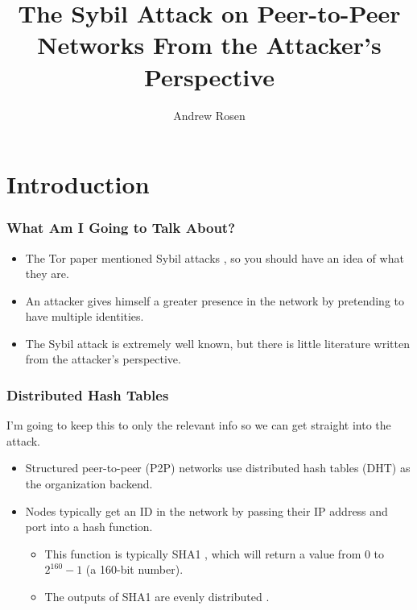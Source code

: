 \documentclass[11pt]{beamer}
\author{Andrew Rosen}
\title{The Sybil Attack on Peer-to-Peer Networks From the Attacker's Perspective}
\institute{Georgia State University}
\begin{document}
    \maketitle
    
    
    \section{Introduction}
    \begin{frame}
        \frametitle[Introduction]{What Am I Going to Talk About? }
        \begin{itemize}
            \item The Tor paper mentioned Sybil attacks \cite{sybil}, so you should have an idea of what they are.
            \item An attacker gives himself a greater presence in the network by pretending to have multiple identities.
            \item The Sybil attack is extremely well known, but there is little literature written from the attacker's perspective.
        \end{itemize}
    \end{frame}
    
    
    
    
    \begin{frame}
        \frametitle[DHTs]{Distributed Hash Tables}
        I'm going to keep this to only the relevant info so we can get straight into the attack.
        \begin{itemize}
            \item Structured peer-to-peer (P2P) networks use distributed hash tables (DHT) as the organization backend.
            \item Nodes typically get an ID in the network by passing their IP address and port into a hash function.
            \begin{itemize}
                \item This function is typically SHA1 \cite{sha1}, which will return a value from 0 to $2^{160} -1 $  (a 160-bit number).
                \item The outputs of SHA1 are evenly distributed \cite{bellare2004hash}.
                
            \end{itemize}
            
        \end{itemize}
    \end{frame}
\end{document}
